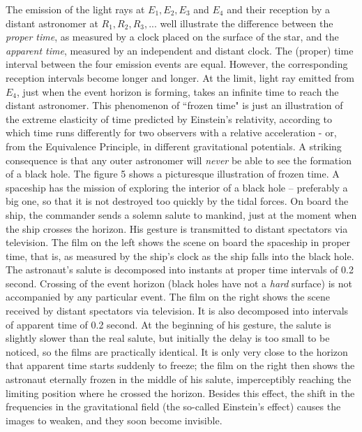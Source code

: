 \documentclass{lamuphys}
\begin{document}
The emission of the light
rays at $E_1, E_2, E_3$ and $E_4$ and their reception by a distant astronomer
at $R_1, R_2, R_3, ...$ well illustrate the difference between the {\it proper
time}, as measured by a clock placed on the surface of the star, and the {\it
apparent time}, measured by an independent and distant clock. The (proper) time
interval between the four emission events are equal. However, the
corresponding reception intervals become longer and longer. At the limit,
light ray emitted from $E_4$, just when the event horizon is forming, takes an
infinite time to reach the distant astronomer. This phenomenon of ``frozen
time" is just an illustration of the extreme elasticity of time predicted by
Einstein's relativity, according to which time runs differently for two
observers with a relative acceleration - or, from the Equivalence Principle,
in different gravitational potentials. A striking consequence is that any
outer astronomer will {\it never} be able to see the formation of a black
hole. The figure 5 shows a picturesque illustration of frozen time. A
spaceship has the mission of exploring the interior of a black hole --
preferably a big one, so that it is not destroyed too quickly by the tidal
forces. On board the ship, the commander sends a solemn salute to mankind,
just at the moment when the ship crosses the horizon. His gesture is
transmitted to distant spectators via television. The film on the left shows
the scene on board the spaceship in proper time, that is, as measured by the
ship's clock as the ship falls into the black hole. The astronaut's salute
is decomposed into instants at proper time intervals of 0.2 second. Crossing of
the event horizon (black holes have not a {\it hard} surface)  is not
accompanied by any particular event. The film on the right shows the scene
received by distant spectators via television. It is also decomposed
into intervals of apparent time of 0.2 second. At the beginning of his
gesture, the salute is slightly slower than the real salute, but initially
the delay is too small to be noticed, so the films are practically
identical. It is only very close to the horizon that apparent time starts
suddenly to freeze;  the film on the right then shows the astronaut eternally
frozen in the middle of his salute, imperceptibly reaching the limiting
position where he crossed the horizon. Besides this effect, the shift in the
frequencies in the gravitational field  (the so-called Einstein's effect)
causes the images to weaken, and they soon become invisible.
\end{document}

